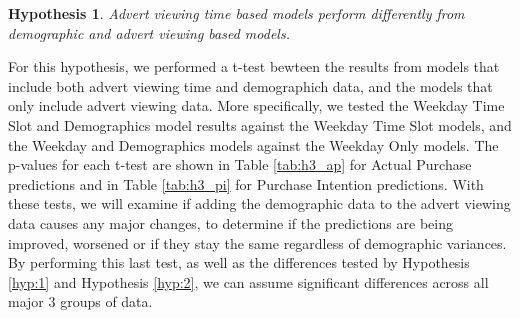 \documentclass[review]{elsarticle}
\newtheorem{hyp}{Hypothesis}
\begin{document}
\begin{hyp}
\label{hyp:3}
Advert viewing time based models perform differently from demographic and advert viewing based models.
\end{hyp}

For this hypothesis, we performed a t-test bewteen the results from models that include both advert viewing time and demographich data, and the models that only include advert viewing data. More specifically, we tested the Weekday Time Slot and Demographics model results against the Weekday Time Slot models, and the Weekday and Demographics models against the Weekday Only models. The p-values for each t-test are shown in Table \ref{tab:h3_ap} for Actual Purchase predictions and in Table \ref{tab:h3_pi} for Purchase Intention predictions. With these tests, we will examine if adding the demographic data to the advert viewing data causes any major changes, to determine if the predictions are being improved, worsened or if they stay the same regardless of demographic variances. By performing this last test, as well as the differences tested by Hypothesis \ref{hyp:1} and Hypothesis \ref{hyp:2}, we can assume significant differences across all major 3 groups of data.
\end{document}
